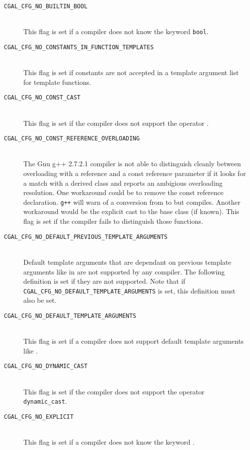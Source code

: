 \begin{description}
\item[{\tt CGAL\_CFG\_NO\_BUILTIN\_BOOL}]~\\
  This flag is set if a compiler does not know the keyword {\tt bool}.

\item[{\tt CGAL\_CFG\_NO\_CONSTANTS\_IN\_FUNCTION\_TEMPLATES}]~\\
  This flag is set if constants are not accepted in a template
  argument list for template functions.

\item[{\tt CGAL\_CFG\_NO\_CONST\_CAST}]~\\
  This flag is set if the compiler does not support the operator
  .

\item[{\tt CGAL\_CFG\_NO\_CONST\_REFERENCE\_OVERLOADING}]~\\
  The Gnu g++ 2.7.2.1 compiler is not able to distinguish cleanly between
  overloading with a reference and a const reference parameter if it
  looks for a match with a derived class and reports an ambigious
  overloading resolution. One workaround could be to remove the const
  reference declaration. {\tt g++} will warn of a conversion from  to  but compiles. Another workaround would be the
  explicit cast to the base class (if known).  This flag 
  is set if the compiler fails to distinguish those functions.

\item[{\tt CGAL\_CFG\_NO\_DEFAULT\_PREVIOUS\_TEMPLATE\_ARGUMENTS}]~\\
  Default template arguments that are dependant on previous template
  arguments like in 
  are not supported by any compiler. The following definition is set
  if they are not supported. Note that if {\tt
    CGAL\_CFG\_NO\_DEFAULT\_TEMPLATE\_ARGUMENTS} is set, this
  definition must also be set.

\item[{\tt CGAL\_CFG\_NO\_DEFAULT\_TEMPLATE\_ARGUMENTS}]~\\
  This flag is set if a compiler does not support default template
  arguments like .
 
\item[{\tt CGAL\_CFG\_NO\_DYNAMIC\_CAST}]~\\ 
  This flag is set
  if the compiler does not support the operator \texttt{dynamic\_cast}.

\item[{\tt CGAL\_CFG\_NO\_EXPLICIT}]~\\
  This flag is set if a compiler does not know the keyword
  .


\end{description}

